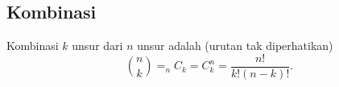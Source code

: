 \subsection{Kombinasi}
Kombinasi $k$ unsur dari $n$ unsur adalah (urutan tak diperhatikan)
$${n \choose k}=_nC_k = C_k^n = \dfrac{n!}{k!(n-k)!}.$$